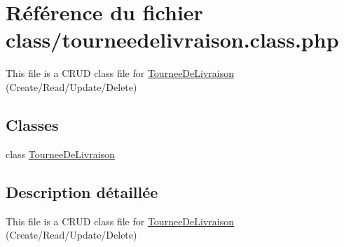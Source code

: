 \hypertarget{tourneedelivraison_8class_8php}{}\section{Référence du fichier class/tourneedelivraison.class.\+php}
\label{tourneedelivraison_8class_8php}


This file is a C\+R\+UD class file for \hyperlink{classTourneeDeLivraison}{Tournee\+De\+Livraison} (Create/\+Read/\+Update/\+Delete)  


\subsection*{Classes}
\begin{DoxyCompactItemize}
\item 
class \hyperlink{classTourneeDeLivraison}{Tournee\+De\+Livraison}
\end{DoxyCompactItemize}


\subsection{Description détaillée}
This file is a C\+R\+UD class file for \hyperlink{classTourneeDeLivraison}{Tournee\+De\+Livraison} (Create/\+Read/\+Update/\+Delete) 

